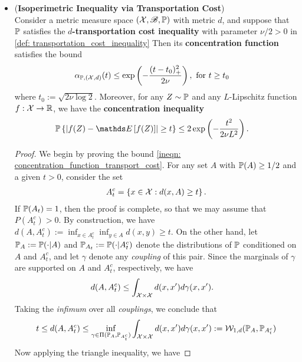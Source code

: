 \documentclass[11pt]{article}
\begin{document}
\begin{itemize}
\item \begin{theorem} (\textbf{Isoperimetric Inequality via Transportation Cost})\citep{wainwright2019high}\\
Consider a metric measure space $({\mathcal X}, {\mathscr B}, {\mathbb P})$ with metric $d$, and suppose that ${\mathbb P}$ satisfies the \textbf{$d$-transportation cost inequality} with parameter $\nu/2 >0$ in \eqref{def: transportation_cost_inequality} Then its \textbf{concentration function} satisfies the bound
\begin{align}
\alpha_{{\mathbb P}, ({\mathcal X}, d)}(t) &\le  \exp\left(- \frac{(t -t_0)_{+}^2}{2 \nu}\right), \text{ for }t  \ge t_0 \label{ineqn: concentration_function_transport_cost}
\end{align} where $t_0 := \sqrt{2\nu \log 2}$.  Moreover, for any $Z \sim {\mathbb P}$ and any $L$-Lipschitz function $f : {\mathcal X} \to {\mathbb R}$, we have the \textbf{concentration inequality}
\begin{align}
\bP\set{\abs{f(Z) - \E{}{f(Z)}} \ge t} &\le 2 \exp\paren{- \frac{t^2}{2 \nu L^2}}.  \label{ineqn: lipschitz_concentration_transport_cost}
\end{align}
\end{theorem}
\begin{proof}
We begin by proving the bound \eqref{ineqn: concentration_function_transport_cost}. For any set $A$ with ${\mathbb P}(A) \ge 1/2$ and a given $t> 0$, consider the set
\begin{align*}
A_t^c = \left\{x \in {\mathcal X}: d(x, A) \ge t\right\}.
\end{align*} If ${\mathbb P}(A_t) = 1$, then the proof is complete, so that we may assume that $P(A_t^c) > 0$. By construction, we have $d(A, A_t^c) := \inf_{x\in A_t^c} \inf_{y \in A}d(x, y) \ge t$. On the other hand, let ${\mathbb P}_A := {\mathbb P}(\cdot | A)$ and ${\mathbb P}_{A_t} := {\mathbb P}(\cdot| A_t^c)$ denote the distributions of ${\mathbb P}$ conditioned on $A$ and $A_t^c$, and let $\gamma$ denote any \emph{coupling} of this pair. Since the marginals of $\gamma$ are supported on $A$ and $A_t^c$, respectively, we have
\begin{align*}
d(A, A_t^c) &\le \int_{{\mathcal X} \times {\mathcal X}} d(x, x') d\gamma(x, x').
\end{align*} Taking the \emph{infimum} over all \emph{couplings}, we conclude that
\begin{align*}
t \le d(A, A_t^c)\le \inf_{\gamma \in \Pi({\mathbb P}_A, {\mathbb P}_{A_t^c})}\int_{{\mathcal X} \times {\mathcal X}} d(x, x') d\gamma(x, x') := {\mathcal W}_{1, d}({\mathbb P}_A, {\mathbb P}_{A_t^c})
\end{align*} Now applying the triangle inequality, we have

\end{proof}
\end{itemize}
\end{document}
